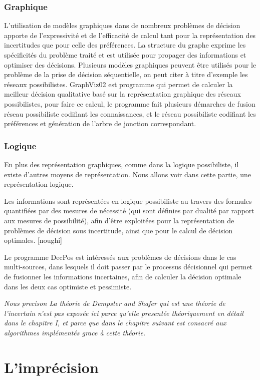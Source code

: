 \subsubsection{Graphique}
L’utilisation de modèles graphiques dans de nombreux problèmes de décision apporte de
l’expressivité et de l’efficacité de calcul tant pour la représentation des incertitudes que pour celle
des préférences. La structure du graphe exprime les spécificités du problème traité et est utilisée
pour propager des informations et optimiser des décisions. Plusieurs modèles graphiques peuvent
être utilisés pour le problème de la prise de décision séquentielle, on peut citer à titre d’exemple les réseaux possibilistes.
GraphViz02 est programme qui permet de calculer la meilleur décision qualitative basé sur la représentation graphique des réseaux possibilistes, pour faire ce calcul, le programme fait plusieurs démarches de fusion réseau possibiliste codifiant les connaissances, et le réseau possibiliste codifiant les préférences et génération de l’arbre de jonction correspondant.
\subsubsection{Logique}
En plus des représentation graphiques, comme dans la logique possibiliste, il existe d’autres moyens de
représentation. Nous allons voir dans cette partie, une représentation logique.

Les informations sont représentées en logique possibiliste au travers des formules quantifiées par des mesures de nécessité (qui sont définies par dualité par rapport aux mesures de possibilité), afin d'être exploitées pour la représentation de problèmes de décision sous incertitude, ainsi que pour le calcul de décision optimales. [noughi]

Le programme DecPos est intéressés aux problèmes de décisions dans le cas multi-sources, dans lesquels il doit passer par le processus décisionnel qui permet de fusionner les informations incertaines, afin de calculer la décision optimale dans les deux cas optimiste et pessimiste.



\emph{ Nous precison La théorie de Dempster and Shafer qui est une théorie de l’incertain n'est pas exposée ici parce qu’elle presentée théoriquement en détail dans le chapitre I, et parce que dans le chapitre suivant est consacré aux algorithmes implémentés grace à cette théorie.}
\section{L’imprécision}

